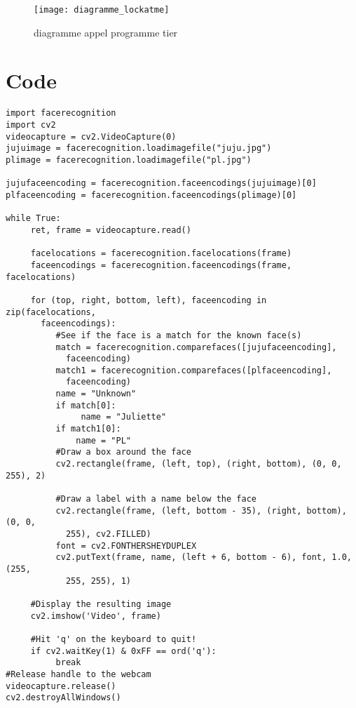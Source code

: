 \begin{figure}[h]
  \texttt{[image: diagramme\_lockatme]}
  \caption{diagramme appel programme tier}
  \label{fig:dialam}
\end{figure}


\chapter{Code}
\newpage
\begin{verbatim}
import facerecognition
import cv2
videocapture = cv2.VideoCapture(0)
jujuimage = facerecognition.loadimagefile("juju.jpg")
plimage = facerecognition.loadimagefile("pl.jpg")

jujufaceencoding = facerecognition.faceencodings(jujuimage)[0]
plfaceencoding = facerecognition.faceencodings(plimage)[0]

while True:
     ret, frame = videocapture.read()

     facelocations = facerecognition.facelocations(frame)
     faceencodings = facerecognition.faceencodings(frame, facelocations)

     for (top, right, bottom, left), faceencoding in zip(facelocations,
       faceencodings):
          #See if the face is a match for the known face(s)
          match = facerecognition.comparefaces([jujufaceencoding],
            faceencoding)
          match1 = facerecognition.comparefaces([plfaceencoding],
            faceencoding)
          name = "Unknown"
          if match[0]:
               name = "Juliette"
          if match1[0]:
              name = "PL"
          #Draw a box around the face
          cv2.rectangle(frame, (left, top), (right, bottom), (0, 0, 255), 2)

          #Draw a label with a name below the face
          cv2.rectangle(frame, (left, bottom - 35), (right, bottom), (0, 0,
            255), cv2.FILLED)
          font = cv2.FONTHERSHEYDUPLEX
          cv2.putText(frame, name, (left + 6, bottom - 6), font, 1.0, (255,
            255, 255), 1)

     #Display the resulting image
     cv2.imshow('Video', frame)

     #Hit 'q' on the keyboard to quit!
     if cv2.waitKey(1) & 0xFF == ord('q'):
          break
#Release handle to the webcam
videocapture.release()
cv2.destroyAllWindows()
\end{verbatim}

